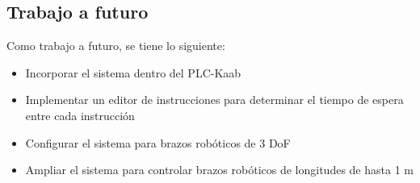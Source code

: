 \subsection{Trabajo a futuro}

Como trabajo a futuro, se tiene lo siguiente:

\begin{itemize}
	\item Incorporar el sistema dentro del PLC-Kaab
	\item Implementar un editor de instrucciones para determinar el tiempo de espera entre cada instrucción
	\item Configurar el sistema para brazos robóticos de 3 DoF
	\item Ampliar el sistema para controlar brazos robóticos de longitudes de hasta 1 m
\end{itemize}